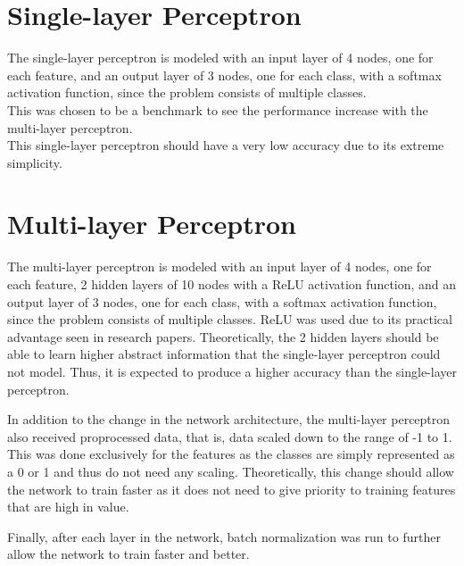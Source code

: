 \documentclass[12pt]{article}
\begin{document}
\section{Single-layer Perceptron}
The single-layer perceptron is modeled with an             
input layer of 4 nodes, one for each feature, and an                     
output layer of 3 nodes, one for each class, with a                     
softmax activation function, since the problem           
consists of multiple classes.\\ This was chosen to be a                   
benchmark to see the performance increase with the               
multi-layer perceptron.\\ This single-layer perceptron should have a very low accuracy due to its extreme                   
simplicity.    

\section{Multi-layer Perceptron }
The multi-layer perceptron is modeled with an input               
layer of 4 nodes, one for each feature, 2 hidden                   
layers of 10 nodes with a ReLU activation function,                 
and an output layer of 3 nodes, one for each class,                     
with a softmax activation function, since the             
problem consists of multiple classes. ReLU was             
used due to its practical advantage seen in research                 
papers. Theoretically, the 2 hidden layers should be               
able to learn higher abstract information that the               
single-layer perceptron could not model. Thus, it is               
expected to produce a higher accuracy than the               
single-layer perceptron.
\par
In addition to the change in the network               
architecture, the multi-layer perceptron also         
received proprocessed data, that is, data scaled             
down to the range of -1 to 1. This was done                     
exclusively for the features as the classes are simply                 
represented as a 0 or 1 and thus do not need any                       
scaling. Theoretically, this change should allow the             
network to train faster as it does not need to give                     
priority to training features that are high in value.
\par
Finally, after each layer in the network,             
batch normalization was run to further allow the               
network to train faster and better.
\end{document}
